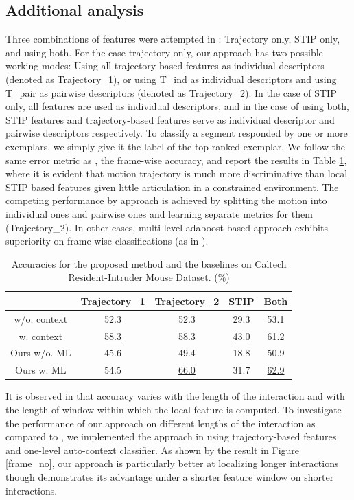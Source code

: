 \documentclass[10pt,twocolumn,letterpaper]{article}
\begin{document}
\subsection{Additional analysis}
Three combinations of features were attempted in \cite{CRIM13}: Trajectory only, STIP only, and using both. For the case trajectory only, our approach has two possible working modes: Using all trajectory-based features as individual descriptors (denoted as Trajectory\_1), or using T\_ind as individual descriptors and using T\_pair as pairwise descriptors (denoted as Trajectory\_2). In the case of STIP only, all features are used as individual descriptors, and in the case of using both, STIP features and trajectory-based features serve as individual descriptor and pairwise descriptors respectively. To classify a segment responded by one or more exemplars, we simply give it the label of the top-ranked exemplar. We follow the same error metric as \cite{CRIM13}, the frame-wise accuracy, and report the results in Table \ref{CRIMAccu}, where it is evident that motion trajectory is much more discriminative than local STIP based features given little articulation in a constrained environment. The competing performance by approach is achieved by splitting the motion into individual ones and pairwise ones and learning separate metrics for them (Trajectory\_2). In other cases, multi-level adaboost based approach exhibits superiority on frame-wise classifications (as in \cite{CRIM13}).


\begin{table}[h]
\centering \caption{Accuracies for the proposed method and the baselines on Caltech Resident-Intruder Mouse Dataset. (\%)}
\footnotesize{
\begin{tabular}{|c||c|c|c|c|}
\hline   & Trajectory\_1  & Trajectory\_2 & STIP & Both \\
\hline \cite{CRIM13} w/o. context & 52.3  & 52.3 & 29.3 & 53.1\\
\hline \cite{CRIM13} w. context &  \underline{58.3} & 58.3 & \underline{43.0} & 61.2\\
\hline Ours w/o. ML &  45.6 & 49.4 & 18.8 & 50.9 \\
\hline Ours w. ML & 54.5 & \underline{66.0} & 31.7 & \underline{62.9}\\
\hline 
\end{tabular}
}
\label{CRIMAccu}
\end{table}

It is observed in \cite{CRIM13} that accuracy varies with the length of the interaction and with the length of window within which the local feature is computed. To investigate the performance of our approach on different lengths of the interaction as compared to \cite{CRIM13}, we implemented the approach in \cite{CRIM13} using trajectory-based features and one-level auto-context classifier. As shown by the result in Figure \ref{frame_no}, our approach is particularly better at localizing longer interactions though \cite{CRIM13} demonstrates its advantage under a shorter feature window on shorter interactions. 
\end{document}
